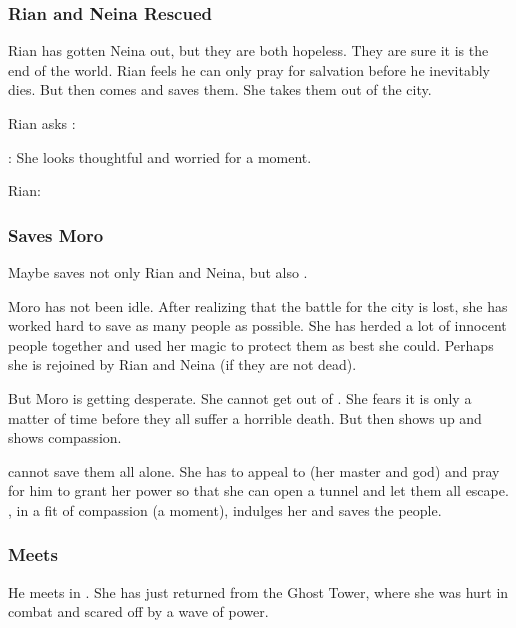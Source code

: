 \subsubsection{Rian and Neina Rescued}
Rian has gotten Neina out, but they are both hopeless.
They are sure it is the end of the world.
Rian feels he can only pray for salvation before he inevitably dies. 
But then \Criseis comes and saves them. 
She takes them out of the city.

Rian asks \Criseis: 

\Criseis: 
She looks thoughtful and worried for a moment.

Rian: 






\subsubsection{Saves Moro}
Maybe \Criseis saves not only Rian and Neina, but also \MoroCobrel.

Moro has not been idle.
After realizing that the battle for the city is lost, she has worked hard to save as many people as possible. 
She has herded a lot of innocent people together and used her magic to protect them as best she could. 
Perhaps she is rejoined by Rian and Neina (if they are not dead).

But Moro is getting desperate.
She cannot get out of \Malcur. 
She fears it is only a matter of time before they all suffer a horrible death. 
But then \Criseis shows up and shows compassion. 

\Criseis cannot save them all alone.
She has to appeal to \Ishnaruchaefir (her master and god) and pray for him to grant her power so that she can open a tunnel and let them all escape. 
\Ishnaruchaefir, in a fit of compassion (a  moment), indulges her and saves the people. 





\subsubsection{Meets \Nzessuacrith}
He meets \Nzessuacrith{} in \Malcur. 
She has just returned from the Ghost Tower, where she was hurt in combat and scared off by a wave of \sathariah{} power. 

